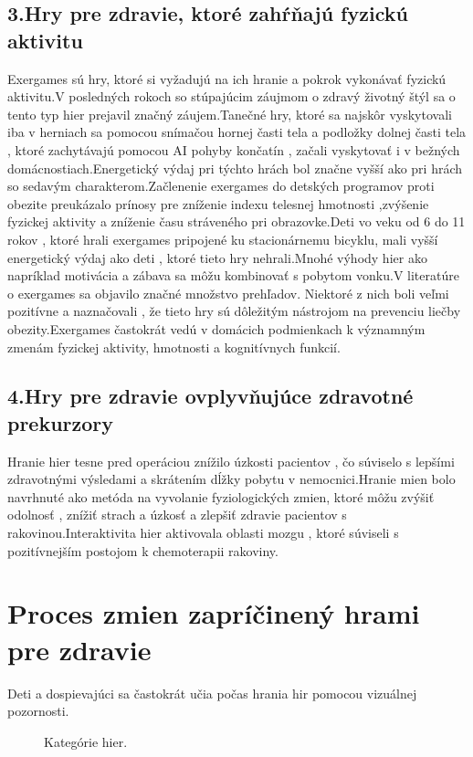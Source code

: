 \documentclass[10pt,oneside,slovak,a4paper]{article}
\begin{document}
\subsection{3.Hry pre zdravie, ktoré zahŕňajú fyzickú aktivitu}
Exergames sú hry, ktoré si vyžadujú na ich hranie a pokrok vykonávať fyzickú aktivitu.V posledných rokoch so stúpajúcim záujmom o zdravý životný štýl sa o tento typ hier prejavil značný záujem.Tanečné hry, ktoré sa najskôr vyskytovali iba v herniach sa pomocou snímačou hornej časti tela a podložky dolnej časti tela , ktoré zachytávajú pomocou AI pohyby končatín , začali vyskytovať i v bežných domácnostiach.Energetický výdaj pri týchto hrách bol značne vyšší ako pri hrách so sedavým charakterom.Začlenenie exergames do detských programov proti obezite preukázalo prínosy pre zníženie indexu telesnej hmotnosti ,zvýšenie fyzickej aktivity a zníženie času stráveného pri obrazovke.Deti vo veku od 6 do 11 rokov , ktoré hrali exergames pripojené ku stacionárnemu bicyklu, mali vyšší energetický výdaj ako deti , ktoré tieto hry nehrali.Mnohé výhody hier ako napríklad motivácia a zábava sa môžu kombinovať s pobytom vonku.V literatúre o exergames sa objavilo značné množstvo prehľadov. Niektoré z nich boli veľmi pozitívne a naznačovali , že tieto hry sú dôležitým nástrojom na prevenciu liečby obezity.Exergames častokrát vedú v domácich podmienkach k významným zmenám fyzickej aktivity, hmotnosti a kognitívnych funkcií.
\subsection{4.Hry pre zdravie ovplyvňujúce zdravotné prekurzory}
Hranie hier tesne pred operáciou znížilo úzkosti pacientov , čo súviselo s lepšími zdravotnými výsledami a skrátením dĺžky pobytu v nemocnici.Hranie mien bolo navrhnuté ako metóda na vyvolanie fyziologických zmien, ktoré môžu zvýšiť odolnosť , znížiť strach a úzkosť a zlepšiť zdravie pacientov s rakovinou.Interaktivita hier aktivovala oblasti mozgu , ktoré súviseli s pozitívnejším postojom k chemoterapii rakoviny.

\section{Proces zmien zapríčinený hrami pre zdravie}
Deti a dospievajúci sa častokrát učia počas hrania hir pomocou vizuálnej pozornosti.
\begin{figure}[tbh]
\centering
\caption{Kategórie hier.}
\label{f:rozhod}
\end{figure}
\end{document}
